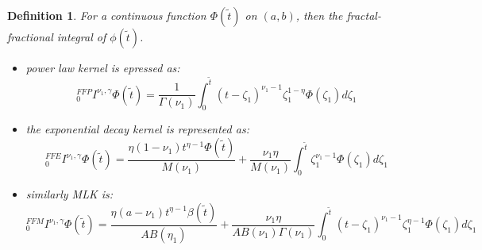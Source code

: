 \documentclass[10pt,a4paper]{amsart}
\newtheorem{definition}{Definition}[section]
\numberwithin{equation}{section}
\begin{document}
\begin{definition}\label{def2-2}
For a continuous function $\Phi(\tilde{t})$ on $(a,b)$, then the fractal-fractional
integral of $\phi(\tilde{t})$.
\begin{itemize}
    \item power law kernel is epressed as:
\begin{equation}\label{eq2-5}
    _0^{FFP}I^{\nu_1, \gamma}  \Phi (\tilde{t}) = \frac{1}{\Gamma ( \nu_1)} \int_0^{\tilde{t}} (t-\zeta_1)^{\nu_1-1} \zeta_1^{1-\eta} \Phi (\zeta_1) d\zeta_1
\end{equation}
\item the exponential decay kernel is represented as:
\begin{equation}\label{eq2-6}
    _0^{FFE}I^{\nu_1, \gamma}  \Phi (\tilde{t}) = \frac{\eta (1-\nu_1) t^{\eta -1} \Phi(\tilde{t})}{M(\nu_1)} +  \frac{\nu_1 \eta}{M (\nu_1)}  \int_0^{\tilde{t}} \zeta_1^{\nu_1-1} \Phi (\zeta_1) d\zeta_1    
\end{equation}
\item similarly MLK is:
\begin{equation}\label{eq2-7}
    _0^{FFM}I^{\nu_1, \gamma}  \Phi (\tilde{t}) = \frac{\eta (a-\nu_1) t^{\eta -1} \beta(\tilde{t})}{AB (\eta_1)} + \frac{ \nu_1 \eta }{AB(\nu_1) \Gamma(\nu_1) } \int_0^{\tilde{t}} (t- \zeta_1)^{\nu_1 -1 } \zeta_1^{\eta-1} \Phi (\zeta_1)   d\zeta_1    
\end{equation}
\end{itemize}
\end{definition}
\end{document}
